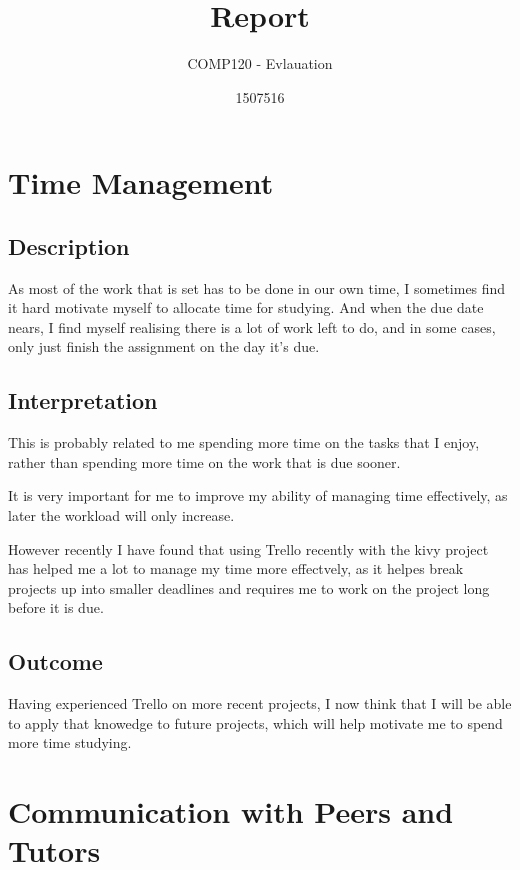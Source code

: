\documentclass{scrartcl}
\title{Report}
\subtitle{COMP120 - Evlauation}
\author{1507516}
\begin{document}
\maketitle


\section{Time Management}

\subsection{Description} 

As most of the work that is set has to be done in our own time, I sometimes find it hard motivate myself to allocate time for studying. And when the due date nears, I find myself realising there is a lot of work left to do, and in some cases, only just finish the assignment on the day it's due.

\subsection{Interpretation} 

This is probably related to me spending more time on the tasks that I enjoy, rather than spending more time on the work that is due sooner. 

It is very important for me to improve my ability of managing time effectively, as later the workload will only increase. 

However recently I have found that using Trello recently with the kivy project has helped me a lot to manage my time more effectvely, as it helpes break projects up into smaller deadlines and requires me to work on the project long before it is due.

\subsection{Outcome} 

Having experienced Trello on more recent projects, I now think that I will be able to apply that knowedge to future projects, which will help motivate me to spend more time studying. 

\section{Communication with Peers and Tutors}
\end{document}
